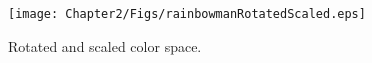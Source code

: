 \begin{figure}[h!]
  \centering
    \texttt{[image: Chapter2/Figs/rainbowmanRotatedScaled.eps]}
    \caption{Rotated and scaled color space.}
\end{figure}







